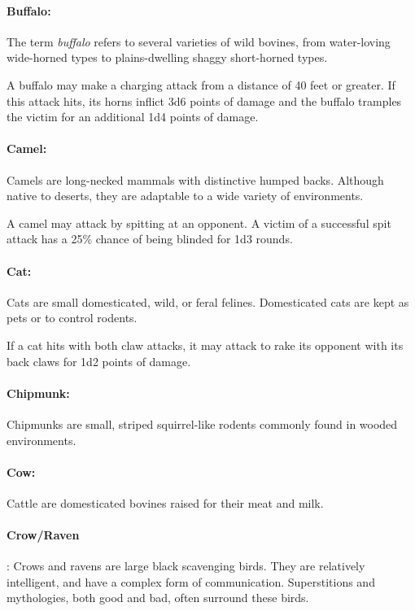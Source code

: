 \begin{multicols}{2}
\paragraph{Buffalo:} The term \textit{buffalo} refers to several varieties of wild bovines, from water-loving wide-horned types to plains-dwelling shaggy short-horned types.

A buffalo may make a charging attack from a distance of 40 feet or greater. If this attack hits, its horns inflict 3d6 points of damage and the buffalo tramples the victim for an additional 1d4 points of damage.

\paragraph{Camel:} Camels are long-necked mammals with distinctive humped backs. Although native to deserts, they are adaptable to a wide variety of environments.

A camel may attack by spitting at an opponent. A victim of a successful spit attack has a 25\% chance of being blinded for 1d3 rounds.

\paragraph{Cat:} Cats are small domesticated, wild, or feral felines. Domesticated cats are kept as pets or to control rodents.

If a cat hits with both claw attacks, it may attack to rake its opponent with its back claws for 1d2 points of damage.

\paragraph{Chipmunk:} Chipmunks are small, striped squirrel-like rodents commonly found in wooded environments.

\paragraph{Cow:} Cattle are domesticated bovines raised for their meat and milk.

\paragraph{Crow/Raven}: Crows and ravens are large black scavenging birds. They are relatively intelligent, and have a complex form of communication. Superstitions and mythologies, both good and bad, often surround these birds.


\end{multicols}
